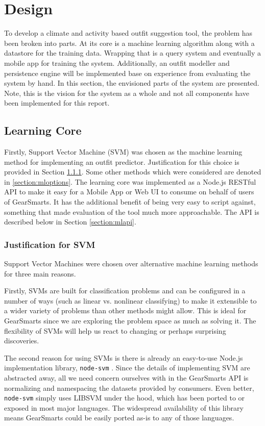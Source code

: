 \section{Design}
\label{section:design}
To develop a climate and activity based outfit suggestion tool, the problem has been broken into parts.
At its core is a machine learning algorithm along with a datastore for the training data. Wrapping that is
a query system and eventually a mobile app for training the system. Additionally, an outfit modeller and persistence
engine will be implemented base on experience from evaluating the system by hand.
In this section, the envisioned parts of the system are presented. Note, this is the vision for the system as a whole and
not all components have been implemented for this report.

\subsection{Learning Core}
Firstly, Support Vector Machine (SVM) \cite{SVM} was chosen as the machine learning method for implementing an outfit predictor.
Justification for this choice is provided in Section \ref{section:mlsvm}. Some other methods which were considered are
denoted in \ref{section:mloptions}. The learning core was implemented as a Node.js RESTful API to make it easy for a
Mobile App or Web UI to consume on behalf of users of GearSmarts. It has the additional benefit of being very easy to
script against, something that made evaluation of the tool much more approachable.
The API is described below in Section \ref{section:mlapi}.

\subsubsection{Justification for SVM}
\label{section:mlsvm}
Support Vector Machines were chosen over alternative machine learning methods for three main reasons.

Firstly, SVMs are built for classification problems and can be configured in a number of ways (such as linear vs.
nonlinear classifying) to make it extensible to a wider variety of problems than other methods might allow. This is
ideal for GearSmarts since we are exploring the problem space as much as solving it. The flexibility of SVMs will
help us react to changing or perhaps surprising discoveries.

The second reason for using SVMs is there is already an easy-to-use Node.js implementation library, \texttt{node-svm}
\cite{Github:nodesvm}. Since the details of implementing SVM are abstracted away, all we need concern ourselves with in
the GearSmarts API is normalizing and namespacing the datasets provided by consumers. Even better, \texttt{node-svm}
simply uses LIBSVM \cite{lib:libsvm} under the hood, which has been ported to or exposed in most major languages. The
widespread availability of this library means GearSmarts could be easily ported as-is to any of those languages.

